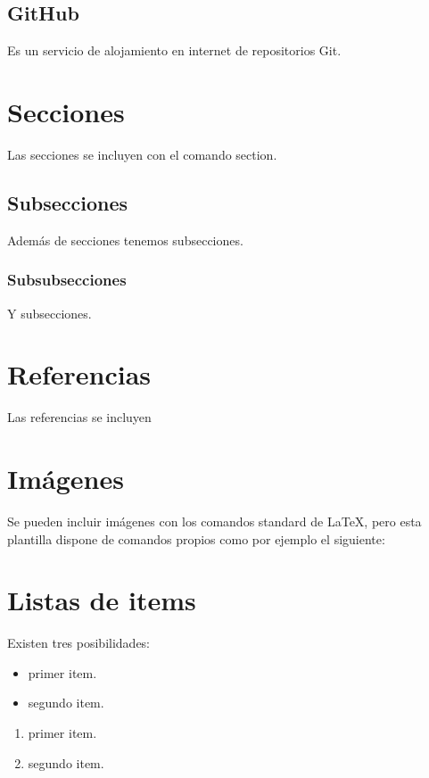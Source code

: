 \subsection{GitHub}

Es un servicio de alojamiento en internet de repositorios Git.

\section{Secciones}

Las secciones se incluyen con el comando section.

\subsection{Subsecciones}

Además de secciones tenemos subsecciones.

\subsubsection{Subsubsecciones}

Y subsecciones. 


\section{Referencias}

Las referencias se incluyen 


\section{Imágenes}

Se pueden incluir imágenes con los comandos standard de \LaTeX, pero esta plantilla dispone de comandos propios como por ejemplo el siguiente:


\section{Listas de items}

Existen tres posibilidades:

\begin{itemize}
	\item primer item.
	\item segundo item.
\end{itemize}

\begin{enumerate}
	\item primer item.
	\item segundo item.
\end{enumerate}

